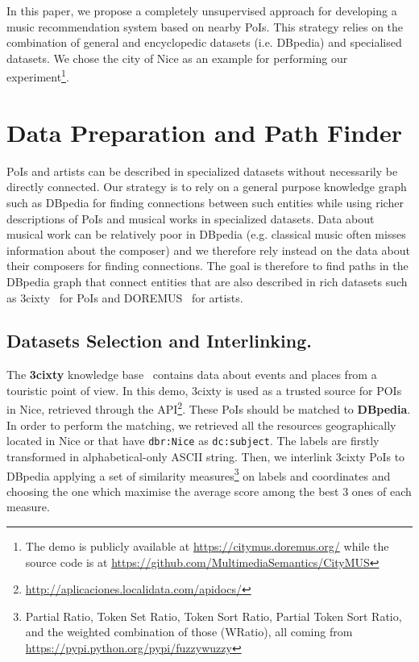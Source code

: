 \documentclass{llncs}
\begin{document}
In this paper, we propose a completely unsupervised approach for developing a music recommendation system based on nearby PoIs. This strategy relies on the combination of general and encyclopedic datasets (i.e. DBpedia) and specialised datasets. We chose the city of Nice as an example for performing our experiment\footnote{The demo is publicly available at \url{https://citymus.doremus.org/} while the source code is at \url{https://github.com/MultimediaSemantics/CityMUS}}.


\section{Data Preparation and Path Finder}
\label{sec:data-processing}
PoIs and artists can be described in specialized datasets without necessarily be directly connected. Our strategy is to rely on a general purpose knowledge graph such as DBpedia for finding connections between such entities while using richer descriptions of PoIs and musical works in specialized datasets. Data about musical work can be relatively poor in DBpedia (e.g. classical music often misses information about the composer) and we therefore rely instead on the data about their composers for finding connections. The goal is therefore to find paths in the DBpedia graph that connect entities that are also described in rich datasets such as 3cixty~\cite{troncy20173cixty} for PoIs and DOREMUS~\cite{achichi2015doremus} for artists.

\subsection*{Datasets Selection and Interlinking.}
The \textbf{3cixty} knowledge base~\cite{troncy20173cixty} contains data about events and places from a touristic point of view. In this demo, 3cixty is used as a trusted source for POIs in Nice, retrieved through the API\footnote{\url{http://aplicaciones.localidata.com/apidocs/}}. These PoIs should be matched to \textbf{DBpedia}. In order to perform the matching, we retrieved all the resources geographically located in Nice or that have \texttt{dbr:Nice} as \texttt{dc:subject}. The labels are firstly transformed in alphabetical-only ASCII string. Then, we interlink 3cixty PoIs to DBpedia applying a set of similarity measures\footnote{Partial Ratio, Token Set Ratio, Token Sort Ratio, Partial Token Sort Ratio, and the weighted combination of those (WRatio), all coming from \url{https://pypi.python.org/pypi/fuzzywuzzy}} on labels and coordinates and choosing the one which maximise the average score among the best 3 ones of each measure.
\end{document}
